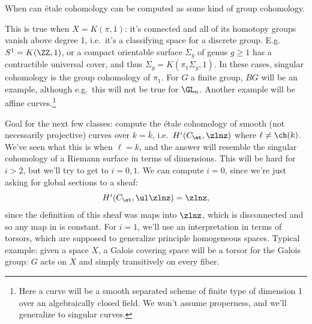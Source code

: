 \begin{question}

When can étale cohomology can be computed as some kind of group
cohomology.

\end{question}

\begin{answer}

This is true when \(X = K(\pi, 1)\): it's connected and all of its
homotopy groups vanish above degree 1, i.e.~it's a classifying space for
a discrete group. E.g. \(S^1 = K(\ZZ, 1)\), or a compact orientable
surface \(\Sigma_g\) of genus \(g\geq 1\) has a contractible universal
cover, and thus \(\Sigma_g = K(\pi_1 \Sigma_g, 1)\). In these cases,
singular cohomology is the group cohomology of \(\pi_1\). For \(G\) a
finite group, \(BG\) will be an example, although e.g.~this will not be
true for \(\GL_n\). Another example will be affine curves.\footnote{Here
  a curve will be a smooth separated scheme of finite type of dimension
  1 over an algebraically closed field. We won't assume properness, and
  we'll generalize to singular curves.}

\end{answer}

Goal for the next few classes: compute the étale cohomology of smooth
(not necessarily projective) curves over \(k=\bar k\),
i.e.~\(H^i(C_\et, \zlnz)\) where \(\ell \neq \ch(k)\). We've seen what
this is when \(\ell = k\), and the answer will resemble the singular
cohomology of a Riemann surface in terms of dimensions. This will be
hard for \(i>2\), but we'll try to get to \(i=0, 1\). We can compute
\(i=0\), since we're just asking for global sections to a sheaf:
\begin{align*}  
H^i (C_\et, \ul\zlnz) = \zlnz
,\end{align*} since the definition of this sheaf was maps into
\(\zlnz\), which is disconnected and so any map in is constant. For
\(i=1\), we'll use an interpretation in terms of torsors, which are
supposed to generalize principle homogeneous spaces. Typical example:
given a space \(X\), a Galois covering space will be a torsor for the
Galois group: \(G\) acts on \(X\) and simply transitively on every
fiber.

